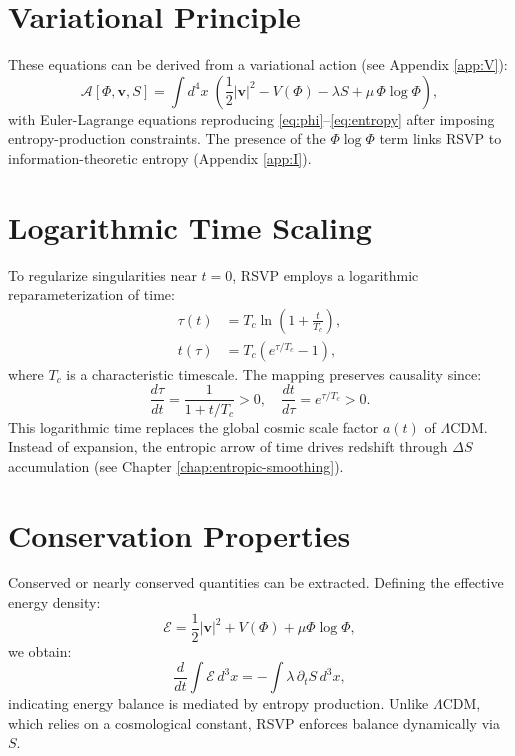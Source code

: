 \documentclass[12pt]{report}
\begin{document}
\section{Variational Principle}
These equations can be derived from a variational action (see Appendix \ref{app:V}):
\begin{equation}
\mathcal{A}[\Phi,\mathbf{v},S] = \int d^4x \; \left( \frac{1}{2}|\mathbf{v}|^2 - V(\Phi) - \lambda S + \mu \, \Phi \log \Phi \right), \label{eq:action}
\end{equation}
with Euler-Lagrange equations reproducing \eqref{eq:phi}--\eqref{eq:entropy} after imposing entropy-production constraints. The presence of the \(\Phi \log \Phi\) term links RSVP to information-theoretic entropy (Appendix \ref{app:I}).

\section{Logarithmic Time Scaling}
To regularize singularities near \(t=0\), RSVP employs a logarithmic reparameterization of time:
\begin{align}
\tau(t) &= T_c \ln\left(1+\frac{t}{T_c}\right), \label{eq:logtime1} \\
t(\tau) &= T_c \left(e^{\tau/T_c} - 1\right), \label{eq:logtime2}
\end{align}
where \(T_c\) is a characteristic timescale. The mapping preserves causality since:
\begin{equation}
\frac{d\tau}{dt} = \frac{1}{1+t/T_c} > 0, \quad \frac{dt}{d\tau} = e^{\tau/T_c} > 0.
\end{equation}
This logarithmic time replaces the global cosmic scale factor \(a(t)\) of \(\Lambda\)CDM. Instead of expansion, the entropic arrow of time drives redshift through \(\Delta S\) accumulation (see Chapter \ref{chap:entropic-smoothing}).

\section{Conservation Properties}
Conserved or nearly conserved quantities can be extracted. Defining the effective energy density:
\begin{equation}
\mathcal{E} = \frac{1}{2}|\mathbf{v}|^2 + V(\Phi) + \mu \Phi \log \Phi,
\end{equation}
we obtain:
\begin{equation}
\frac{d}{dt}\int \mathcal{E}\, d^3x = - \int \lambda \, \partial_t S \, d^3x,
\end{equation}
indicating energy balance is mediated by entropy production. Unlike \(\Lambda\)CDM, which relies on a cosmological constant, RSVP enforces balance dynamically via \(S\).
\end{document}
